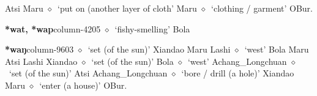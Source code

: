          Atsi 
\hspace{1ex}
         Maru 
\hspace{1ex}
         $\diamond$~`put on (another layer of cloth'
         Maru 
\hspace{1ex}
         $\diamond$~`clothing / garment'
         OBur. 
  \item {\footnotesize \textbf{*wat, *wap}}{\tiny column-4205}
         $\diamond$~`fishy-smelling'
         Bola 
  \item {\footnotesize \textbf{*waŋ}}{\tiny column-9603}
         $\diamond$~`set (of the sun)'
         Xiandao 
\hspace{1ex}
         Maru 
\hspace{1ex}
         Lashi 
\hspace{1ex}
         $\diamond$~`west'
         Bola 
\hspace{1ex}
         Maru 
\hspace{1ex}
         Atsi 
\hspace{1ex}
         Lashi 
\hspace{1ex}
         Xiandao 
\hspace{1ex}
         $\diamond$~`set (of the sun)'
         Bola 
\hspace{1ex}
         $\diamond$~`west'
         Achang\_Longchuan 
\hspace{1ex}
         $\diamond$~`set (of the sun)'
         Atsi 
\hspace{1ex}
         Achang\_Longchuan 
\hspace{1ex}
         $\diamond$~`bore / drill (a hole)'
         Xiandao 
\hspace{1ex}
         Maru 
\hspace{1ex}
         $\diamond$~`enter (a house)'
         OBur. 
\hspace{1ex}

